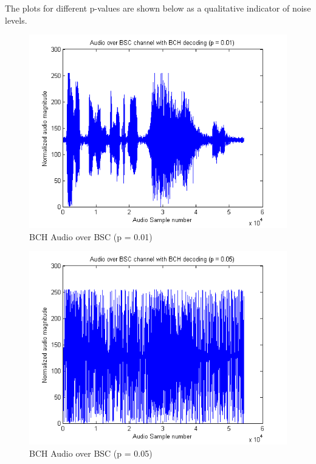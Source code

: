 \documentclass[a4paper]{article}
\begin{document}
The plots for different p-values are shown below as a qualitative indicator of noise levels.

\begin{figure}[H]
\centering
\includegraphics[scale=0.5]{plots/audio_over_bsc_bch_p_001.png}
\caption{BCH Audio over BSC (p = 0.01)}
\end{figure}

\begin{figure}[H]
\centering
\includegraphics[scale=0.5]{plots/audio_over_bsc_bch_p_005.png}
\caption{BCH Audio over BSC (p = 0.05)}
\end{figure}
\end{document}
